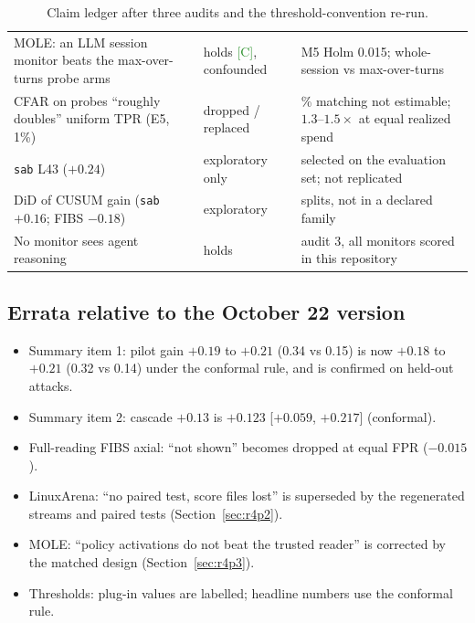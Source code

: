 \documentclass[11pt]{article}
\newcommand{\tC}{\textsf{\scriptsize\textcolor{ForestGreen}{[C]}}\xspace}
\begin{document}
\begin{table}[!htbp]
\begin{tabularx}{\linewidth}{@{}>{\raggedright\arraybackslash}p{5.0cm}>{\raggedright\arraybackslash}p{2.1cm}>{\raggedright\arraybackslash}X@{}}
MOLE: an LLM session monitor beats the max-over-turns probe arms & holds \tC, confounded & M5 Holm 0.015; whole-session vs max-over-turns\\
CFAR on probes ``roughly doubles'' uniform TPR (E5, 1\%) & dropped / replaced & 1\% matching not estimable; $1.3$--$1.5\times$ at equal realized spend\\
\texttt{sab} L43 ($+0.24$) & exploratory only & selected on the evaluation set; not replicated\\
DiD of CUSUM gain (\texttt{sab} $+0.16$; FIBS $-0.18$) & exploratory & 10 splits, not in a declared family\\
No monitor sees agent reasoning & holds & audit 3, all monitors scored in this repository\\
\bottomrule
\end{tabularx}
\caption{Claim ledger after three audits and the threshold-convention re-run.}
\label{tab:ledger}
\end{table}

\subsection*{Errata relative to the October 22 version}
\begin{itemize}
\item Summary item 1: pilot gain $+0.19$ to $+0.21$ (0.34 vs 0.15) is now $+0.18$ to $+0.21$ (0.32 vs 0.14) under the conformal rule, and is confirmed on held-out attacks.
\item Summary item 2: cascade $+0.13$ is $+0.123$ [$+0.059$, $+0.217$] (conformal).
\item Full-reading FIBS axial: ``not shown'' becomes dropped at equal FPR ($-0.015$).
\item LinuxArena: ``no paired test, score files lost'' is superseded by the regenerated streams and paired tests (Section~\ref{sec:r4p2}).
\item MOLE: ``policy activations do not beat the trusted reader'' is corrected by the matched design (Section~\ref{sec:r4p3}).
\item Thresholds: plug-in values are labelled; headline numbers use the conformal rule.
\end{itemize}
\end{document}
